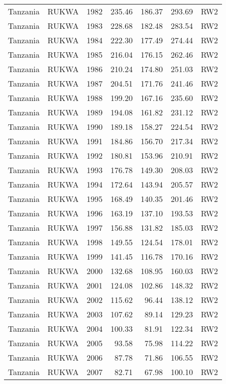 \begin{longtable}{lllrrrl}
  Tanzania & RUKWA & 1982 & 235.46 & 186.37 & 293.69 & RW2 \\ 
  Tanzania & RUKWA & 1983 & 228.68 & 182.48 & 283.54 & RW2 \\ 
  Tanzania & RUKWA & 1984 & 222.30 & 177.49 & 274.44 & RW2 \\ 
  Tanzania & RUKWA & 1985 & 216.04 & 176.15 & 262.46 & RW2 \\ 
  Tanzania & RUKWA & 1986 & 210.24 & 174.80 & 251.03 & RW2 \\ 
  Tanzania & RUKWA & 1987 & 204.51 & 171.76 & 241.46 & RW2 \\ 
  Tanzania & RUKWA & 1988 & 199.20 & 167.16 & 235.60 & RW2 \\ 
  Tanzania & RUKWA & 1989 & 194.08 & 161.82 & 231.12 & RW2 \\ 
  Tanzania & RUKWA & 1990 & 189.18 & 158.27 & 224.54 & RW2 \\ 
  Tanzania & RUKWA & 1991 & 184.86 & 156.70 & 217.34 & RW2 \\ 
  Tanzania & RUKWA & 1992 & 180.81 & 153.96 & 210.91 & RW2 \\ 
  Tanzania & RUKWA & 1993 & 176.78 & 149.30 & 208.03 & RW2 \\ 
  Tanzania & RUKWA & 1994 & 172.64 & 143.94 & 205.57 & RW2 \\ 
  Tanzania & RUKWA & 1995 & 168.49 & 140.35 & 201.46 & RW2 \\ 
  Tanzania & RUKWA & 1996 & 163.19 & 137.10 & 193.53 & RW2 \\ 
  Tanzania & RUKWA & 1997 & 156.88 & 131.82 & 185.03 & RW2 \\ 
  Tanzania & RUKWA & 1998 & 149.55 & 124.54 & 178.01 & RW2 \\ 
  Tanzania & RUKWA & 1999 & 141.45 & 116.78 & 170.16 & RW2 \\ 
  Tanzania & RUKWA & 2000 & 132.68 & 108.95 & 160.03 & RW2 \\ 
  Tanzania & RUKWA & 2001 & 124.08 & 102.86 & 148.32 & RW2 \\ 
  Tanzania & RUKWA & 2002 & 115.62 & 96.44 & 138.12 & RW2 \\ 
  Tanzania & RUKWA & 2003 & 107.62 & 89.14 & 129.23 & RW2 \\ 
  Tanzania & RUKWA & 2004 & 100.33 & 81.91 & 122.34 & RW2 \\ 
  Tanzania & RUKWA & 2005 & 93.58 & 75.98 & 114.22 & RW2 \\ 
  Tanzania & RUKWA & 2006 & 87.78 & 71.86 & 106.55 & RW2 \\ 
  Tanzania & RUKWA & 2007 & 82.71 & 67.98 & 100.10 & RW2 \\ 

\end{longtable}
